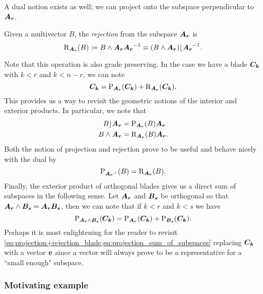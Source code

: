 A dual notion exists as well; we can project onto the subspace perpendicular to $\boldsymbol{A_r}$.
\begin{definition}
Given a multivector $B$, the \emph{rejection} from the subspace $\boldsymbol{A_r}$ is
\begin{equation}
\label{eq:rejection}
\operatorname{R}_{\boldsymbol{A_r}}(B) \coloneqq B \wedge \boldsymbol{A_r} \boldsymbol{A_r}^{-1} \equiv (B\wedge \boldsymbol{A_r})\lfloor \boldsymbol{A_r}^{-1}.
\end{equation}
\end{definition}
Note that this operation is also grade preserving. In the case we have a blade $\boldsymbol{C_k}$ with $k<r$ and $k<n-r$, we can note
\begin{equation}
\label{eq:projection+rejection_blade}
\boldsymbol{C_k}=\operatorname{P}_{\boldsymbol{A_r}}(\boldsymbol{C_k}) + \operatorname{R}_{\boldsymbol{A_r}}(\boldsymbol{C_k}).
\end{equation}
This provides us a way to revisit the geometric notions of the interior and exterior products. In particular, we note that
\begin{align}
    B \rfloor \boldsymbol{A_r} &= \operatorname{P}_{\boldsymbol{A_r}} (B) \boldsymbol{A_r}\\
    B \wedge \boldsymbol{A_r} &= \operatorname{R}_{\boldsymbol{A_r}}(B) \boldsymbol{A_r}.
\end{align}
Both the notion of projection and rejection prove to be useful and behave nicely with the dual by
\begin{equation}
\label{eq:projection_rejection_duality}
\operatorname{P}_{\boldsymbol{A_r}^\perp}(B) = \operatorname{R}_{\boldsymbol{A_r}}(B).
\end{equation}
Finally, the exterior product of orthogonal blades gives us a direct sum of subspaces in the following sense. Let $\boldsymbol{A_r}$ and $\boldsymbol{B_s}$ be orthogonal so that $\boldsymbol{A_r}\wedge \boldsymbol{B_s}=\boldsymbol{A_r}\boldsymbol{B_s}$, then we can note that if $k<r$ and $k<s$ we have
\begin{equation}
\label{eq:projection_sum_of_subspaces}
    \operatorname{P}_{\boldsymbol{A_r}\wedge \boldsymbol{B_s}} (\boldsymbol{C_k}) = \operatorname{P}_{\boldsymbol{A_r}}(\boldsymbol{C_k}) + \operatorname{P}_{\boldsymbol{B_s}}(\boldsymbol{C_k}).
\end{equation}
Perhaps it is most enlightening for the reader to revisit \cref{eq:projection+rejection_blade,eq:projection_sum_of_subspaces} replacing $\boldsymbol{C_k}$ with a vector $\boldsymbol{v}$ since a vector will always prove to be a representative for a ``small enough" subspace.


\subsubsection{Motivating example}
\label{subsubsec:motivating_example}

